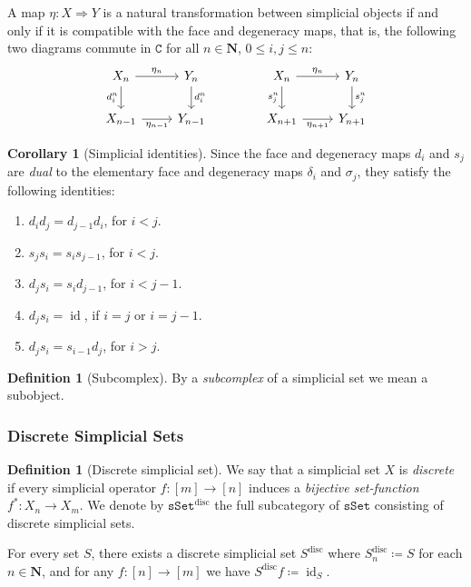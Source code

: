 \documentclass[11pt, reqno]{amsart}
\theoremstyle{definition}
\newtheorem{corollary}[theorem]{Corollary}
\newtheorem{definition}[theorem]{Definition}
\renewcommand{\leq}{\leqslant}
\newcommand{\nat}{\Rightarrow}
\newcommand{\N}{\mathbf{N}}
\newcommand{\cat}{\texttt}
\newcommand{\catfont}{\texttt}
\DeclareMathOperator{\Id}{id}     %
\newcommand{\sSet}{{\catfont{sSet}}}            %
\newcommand{\disc}{\text{disc}}   %
\begin{document}
A map \(\eta: X \nat Y\) is a natural transformation between simplicial objects
if and only if it is compatible with the face and degeneracy maps, that is, the
following two diagrams commute in \(\cat C\) for all \(n \in \N\),
\(0 \leq i, j\leq n\):
\[
\begin{tikzcd}
X_n \ar[r, "\eta_n"] \ar[d, "d_i^n"'] &Y_n \ar[d, "d_i^n"] \\
X_{n-1} \ar[r, "\eta_{n-1}"'] &Y_{n-1}
\end{tikzcd}
\qquad
\qquad
\begin{tikzcd}
X_n \ar[r, "\eta_n"] \ar[d, "s_j^n"'] &Y_n \ar[d, "s_j^n"] \\
X_{n+1} \ar[r, "\eta_{n+1}"'] &Y_{n+1}
\end{tikzcd}
\]

\begin{corollary}[Simplicial identities]
\label{cor:simplicial-identities}
Since the face and degeneracy maps \(d_i\) and \(s_j\) are \emph{dual} to the
elementary face and degeneracy maps \(\delta_i\) and \(\sigma_j\), they satisfy
the following identities:
\begin{enumerate}[(1)]\setlength\itemsep{0em}
\item \(d_i d_j = d_{j-1} d_i\), for \(i < j\).
\item \(s_j s_i = s_i s_{j-1}\), for \(i < j\).
\item \(d_j s_i = s_i d_{j-1}\), for \(i < j-1\).
\item \(d_j s_i = \Id\), if \(i = j\) or \(i = j-1\).
\item \(d_j s_i = s_{i-1} d_j\), for \(i > j\).
\end{enumerate}
\end{corollary}

\begin{definition}[Subcomplex]
\label{def:subcomplex}
By a \emph{subcomplex} of a simplicial set we mean a subobject.
\end{definition}

\subsubsection{Discrete Simplicial Sets}

\begin{definition}[Discrete simplicial set]
\label{def:discrete-simplicial-set}
We say that a simplicial set \(X\) is \emph{discrete} if every simplicial
operator \(f: [m] \to [n]\) induces a \emph{bijective set-function}
\(f^{*}: X_n \to X_m\). We denote by \(\sSet^{\disc}\) the full subcategory of
\(\sSet\) consisting of discrete simplicial sets.

For every set \(S\), there exists a discrete simplicial set \(S^{\disc}\) where
\(S_n^{\disc} \coloneq S\) for each \(n \in \N\), and for any \(f: [n] \to [m]\)
we have \(S^{\disc} f \coloneq \Id_S\).
\end{definition}
\end{document}
